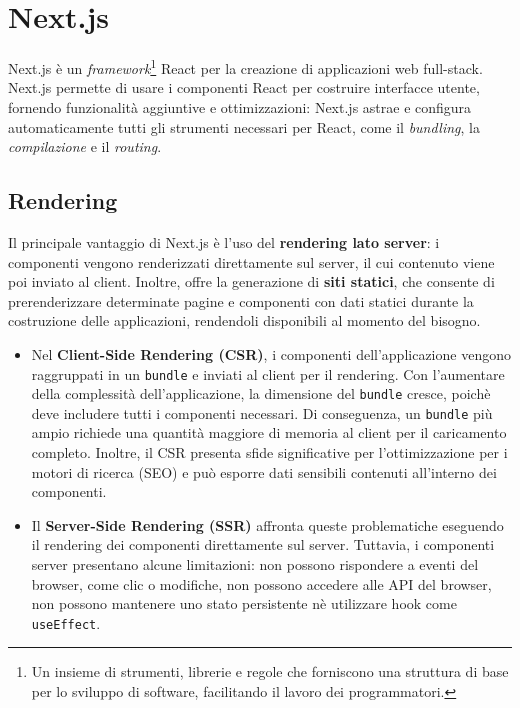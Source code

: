 \documentclass[target=bach,aauheader=,style=]{thud}
\begin{document}
\section{Next.js}
Next.js \cite{nextjsdocs2024} è un \textit{framework}\footnote{Un insieme di strumenti, librerie e regole che forniscono una struttura di base per lo sviluppo di software, facilitando il lavoro dei programmatori.} React per la creazione di applicazioni web full-stack. Next.js permette di usare i componenti React per costruire interfacce utente, fornendo funzionalità aggiuntive e ottimizzazioni: Next.js astrae e configura automaticamente tutti gli strumenti necessari per React, come il \textit{bundling}, la \textit{compilazione} e il \textit{routing}.

\subsection{Rendering}
Il principale vantaggio di Next.js è l'uso del \textbf{rendering lato server}: i componenti vengono renderizzati direttamente sul server, il cui contenuto viene poi inviato al client. Inoltre, offre la generazione di \textbf{siti statici}, che consente di prerenderizzare determinate pagine e componenti con dati statici durante la costruzione delle applicazioni, rendendoli disponibili al momento del bisogno.

\begin{itemize}
    \item Nel \textbf{Client-Side Rendering (CSR)}, i componenti dell'applicazione vengono raggruppati in un \texttt{bundle} e inviati al client per il rendering. Con l'aumentare della complessità dell'applicazione, la dimensione del \texttt{bundle} cresce, poichè deve includere tutti i componenti necessari. Di conseguenza, un \texttt{bundle} più ampio richiede una quantità maggiore di memoria al client per il caricamento completo. Inoltre, il CSR presenta sfide significative per l'ottimizzazione per i motori di ricerca (SEO) e può esporre dati sensibili contenuti all'interno dei componenti.

    \item Il \textbf{Server-Side Rendering (SSR)} affronta queste problematiche eseguendo il rendering dei componenti direttamente sul server. Tuttavia, i componenti server presentano alcune limitazioni: non possono rispondere a eventi del browser, come clic o modifiche, non possono accedere alle API del browser, non possono mantenere uno stato persistente nè utilizzare hook come \texttt{useEffect}.
\end{itemize}
\end{document}
